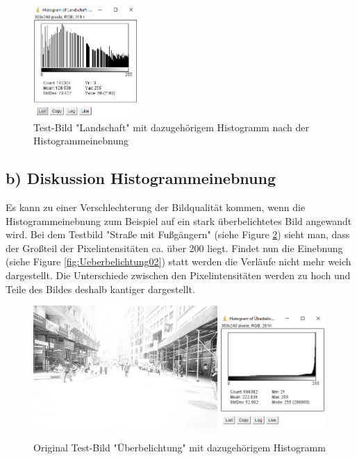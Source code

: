 \documentclass[12pt,german]{article}
\begin{document}
\begin{enumerate}
\begin{figure}[H]
	\includegraphics[width=4cm]{../testData/Results/Landschaft/Landschaft-equalized-histogram.png}
	\caption{Test-Bild "Landschaft" mit dazugehörigem Histogramm nach der Histogrammeinebnung}
	 \label{fig:Landschaft02}
\end{figure}


\end{enumerate}


\pagebreak
\subsection {b) Diskussion Histogrammeinebnung}
Es kann zu einer Verschlechterung der Bildqualität kommen, wenn die Histogrammeinebnung zum Beispiel auf ein stark überbelichtetes Bild angewandt wird. Bei dem Testbild "Straße mit Fußgängern"  (siehe Figure \ref{fig:Ueberbelichtung01}) sieht man, dass der Großteil der Pixelintensitäten ca. über 200 liegt. Findet nun die Einebnung  (siehe Figure \ref{fig:Ueberbelichtung02}) statt werden die Verläufe nicht mehr weich dargestellt. Die Unterschiede zwischen den Pixelintensitäten werden zu hoch und Teile des Bildes deshalb kantiger dargestellt.
\begin{figure}[H] \centering
	\includegraphics[width=7cm]{../testData/Results/Ueberbelichtung/Ueberbelichtung.jpg}
	\includegraphics[width=4cm]{../testData/Results/Ueberbelichtung/Ueberbelichtung-histogram.png}
	\caption{Original Test-Bild "Überbelichtung" mit dazugehörigem Histogramm}
	\label{fig:Ueberbelichtung01}
\end{figure}
\end{document}
